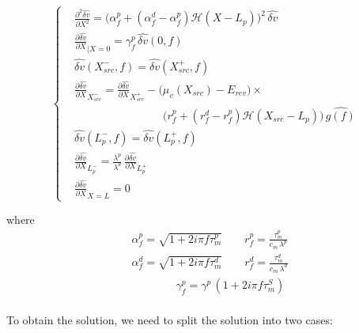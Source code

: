 \documentclass[colorlinks]{article}
\begin{document}
\begin{equation}
\label{eq:psp-equation-fourier}
\left\{
\begin{split}
& \frac{\partial^2 \hat{\delta v}}{\partial X^2} =
\big( \alpha_f^p + (\alpha_f^d-\alpha_f^p) 
\mathcal{H}(X-L_p) \big)^2 \, 
\hat{\delta v}  \\
& \frac{\partial \hat{\delta v}}{\partial X}_{|X=0} = 
 \gamma_f^p \,  \hat{\delta v}(0,f) \\
&  \hat{\delta v}(X_{src}^-,f) = \hat{\delta v}(X_{src}^+,f) \\
& \frac{\partial \hat{\delta v}}{\partial X}_{X_{src}^-} 
= \frac{\partial \hat{\delta v}}{\partial X}_{X_{src}^+} 
- \big(\mu_v(X_{src})-E_{rev}\big) \times \\
& \qquad \qquad \qquad \qquad 
\big( r_f^p + (r_f^d-r_f^p) \mathcal{H}(X_{src}-L_p) \big) \, \hat{g(f)} \\
& \hat{\delta v}(L_p^-,f) = \hat{\delta v}(L_p^+,f) \\
& \frac{\partial \hat{\delta v}}{\partial X}_{L_p^-} 
= \frac{\lambda^p}{\lambda^d} \, 
\frac{\partial \hat{\delta v}}{\partial X}_{L_p^+} \\
& \frac{\partial \hat{\delta v}}{\partial X}_{X=L} = 0
\end{split}
\right.
\end{equation}

where 
\begin{equation}
\begin{split}
& \alpha_f^p = \sqrt{1+ 2 i \pi f \tau_m^p} \qquad
 r_f^p = \frac{\tau_m^p}{c_m \, \lambda^p} \\
& \alpha_f^d = \sqrt{1+ 2 i \pi f \tau_m^d} \qquad
 r_f^d = \frac{\tau_m^d}{c_m \, \lambda^d} \\
& \qquad \qquad \gamma_f^p =  \gamma^p \, (1+ 2 i \pi f \tau_m^S) \\
\end{split}
\end{equation}

To obtain the solution, we need to split the solution into two cases:
\end{document}
